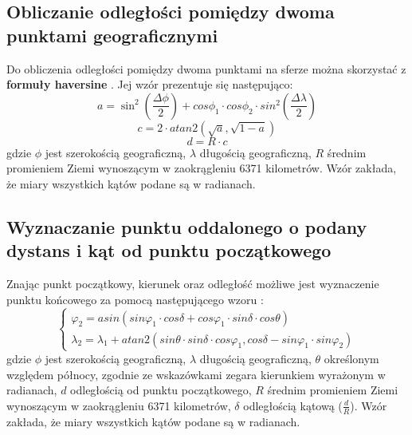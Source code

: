 \subsection{Obliczanie odległości pomiędzy dwoma punktami geograficznymi}\label{chap:haversine}
Do obliczenia odległości pomiędzy dwoma punktami na sferze można skorzystać z \textbf{formuły haversine} \cite{haversine}. Jej wzór prezentuje się następująco:\\
\begin{equation}\label{eq:haversine11}
a = \sin ^2(\frac{\Delta  \phi}{2}) + cos  \phi_1 \cdot cos\phi_2 \cdot sin^2(\frac{\Delta \lambda}{2})
\end{equation}
\begin{equation}\label{eq:haversine2}
c = 2 \cdot atan2( \sqrt{a}, \sqrt{1-a})
\end{equation}
\begin{equation}\label{eq:haversine3}
d = R \cdot c
\end{equation}
gdzie \(\phi\) jest szerokością geograficzną, \(\lambda\) długością geograficzną, \(R\) średnim promieniem Ziemi wynoszącym w zaokrągleniu 6371 kilometrów. Wzór zakłada, że miary wszystkich kątów podane są w radianach.

\subsection{Wyznaczanie punktu oddalonego o podany dystans i kąt od punktu początkowego}
Znając punkt początkowy, kierunek oraz odległość możliwe jest wyznaczenie punktu końcowego za pomocą następującego wzoru \cite{haversine}:
\begin{equation}\label{eq:haversine_generowanie_punktu}
\begin{cases}\varphi_2=asin(sin{ \varphi_1 } \cdot cos{ \delta } + cos{\varphi_1} \cdot sin{\delta} \cdot cos{ \theta })\\
\lambda_2 = \lambda_1 + atan2(sin \theta \cdot sin \delta \cdot cos \varphi_1, cos \delta -sin \varphi_1 \cdot sin  \varphi_2 )
\end{cases}
\end{equation}
gdzie \(\phi\) jest szerokością geograficzną, \(\lambda\) długością geograficzną, \(\theta\) określonym względem północy, zgodnie ze wskazówkami zegara kierunkiem wyrażonym w radianach, \(d\) odległością od punktu początkowego,
\(R\) średnim promieniem Ziemi wynoszącym w zaokrągleniu 6371 kilometrów, \(\delta\) odległością kątową (\(\frac{d}{R}\)). Wzór zakłada, że miary wszystkich kątów podane są w radianach.

